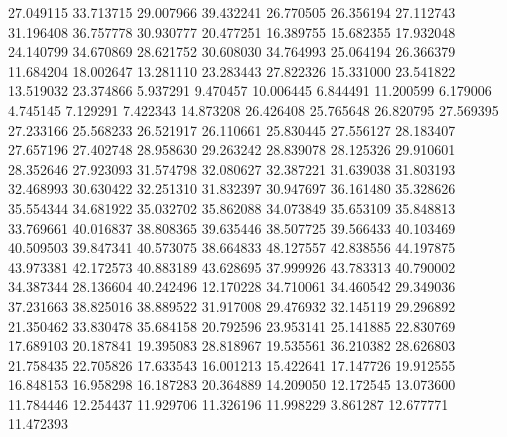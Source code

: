 27.049115
33.713715
29.007966
39.432241
26.770505
26.356194
27.112743
31.196408
36.757778
30.930777
20.477251
16.389755
15.682355
17.932048
24.140799
34.670869
28.621752
30.608030
34.764993
25.064194
26.366379
11.684204
18.002647
13.281110
23.283443
27.822326
15.331000
23.541822
13.519032
23.374866
5.937291
9.470457
10.006445
6.844491
11.200599
6.179006
4.745145
7.129291
7.422343
14.873208
26.426408
25.765648
26.820795
27.569395
27.233166
25.568233
26.521917
26.110661
25.830445
27.556127
28.183407
27.657196
27.402748
28.958630
29.263242
28.839078
28.125326
29.910601
28.352646
27.923093
31.574798
32.080627
32.387221
31.639038
31.803193
32.468993
30.630422
32.251310
31.832397
30.947697
36.161480
35.328626
35.554344
34.681922
35.032702
35.862088
34.073849
35.653109
35.848813
33.769661
40.016837
38.808365
39.635446
38.507725
39.566433
40.103469
40.509503
39.847341
40.573075
38.664833
48.127557
42.838556
44.197875
43.973381
42.172573
40.883189
43.628695
37.999926
43.783313
40.790002
34.387344
28.136604
40.242496
12.170228
34.710061
34.460542
29.349036
37.231663
38.825016
38.889522
31.917008
29.476932
32.145119
29.296892
21.350462
33.830478
35.684158
20.792596
23.953141
25.141885
22.830769
17.689103
20.187841
19.395083
28.818967
19.535561
36.210382
28.626803
21.758435
22.705826
17.633543
16.001213
15.422641
17.147726
19.912555
16.848153
16.958298
16.187283
20.364889
14.209050
12.172545
13.073600
11.784446
12.254437
11.929706
11.326196
11.998229
3.861287
12.677771
11.472393
